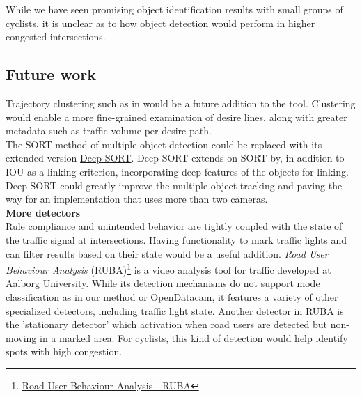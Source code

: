 While we have seen promising object identification results with small groups
of cyclists, it is unclear as to how object detection would perform in higher congested intersections. 
\ \\

\subsection{Future work}
Trajectory clustering such as in \cite{gariel_trajectory_2011} would be a future addition to the tool.
Clustering would enable a more fine-grained examination of desire lines,
along with greater metadata such as traffic volume per desire path.
\ \\

The SORT method of multiple object detection could be replaced with its extended version \href{https://github.com/nwojke/deep_sort}{Deep SORT}.
Deep SORT extends on SORT by, in addition to IOU as a linking criterion, incorporating
deep features of the objects for linking. Deep SORT could greatly improve the multiple object tracking
and paving the way for an implementation that uses more than two cameras.
\ \\

\textbf{More detectors} \\
Rule compliance and unintended behavior are tightly coupled with the state of the traffic signal at intersections. 
Having functionality to mark traffic lights and can filter results based on their state would be a useful addition. 
\textit{Road User Behaviour Analysis} (RUBA)\footnote{\href{https://vbn.aau.dk/en/publications/the-ruba-watchdog-video-analysis-tool}{Road User Behaviour Analysis - RUBA}} 
is a video analysis tool for traffic developed at Aalborg University. While its detection mechanisms do not support mode classification
as in our method or OpenDatacam, it features a variety of other specialized detectors, including traffic light state. 
Another detector in RUBA is the 'stationary detector' which activation when road users are detected but non-moving in a marked area. 
For cyclists, this kind of detection would help identify spots with high congestion.
